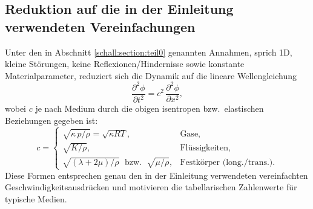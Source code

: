\begin{comment}
\paragraph{Interpretation}
\begin{itemize}
  \item $c_L$ hängt von \emph{Volumensteifigkeit} ab: $(\lambda+2\mu)$ skaliert den Widerstand gegen Volumenänderung (\emph{Druck-/Kompressionswelle}).
  \item $c_T$ hängt allein von der \emph{Schersteifigkeit} $\mu$ ab (\emph{Scherwelle}); in Fluiden ist $\mu\approx 0$, daher keine Transversalwellen.
\end{itemize}

Somit erhält man in isotropen Medien zwei Wellengeschwindigkeiten \cite{schall:landaulifschitz,schall:gurtin}:
\begin{align}
    \boxed{\,c_T=\sqrt{\frac{\mu}{\rho}}=\sqrt{\frac{G}{\rho}}\,} \quad &\text{(transversal, Scherwellen)},\\[2mm]
    \boxed{\,c_L=\sqrt{\frac{\lambda+2\mu}{\rho}}\,} \quad &\text{(longitudinal, Druckwellen)}.
\end{align}
In technischen Materialparametern, sprich Elastizitätsmodul $E$ und Poissonzahl $\nu$, mit
\[
    \mu=G=\frac{E}{2(1+\nu)},
    \qquad
    \lambda=\frac{E\,\nu}{(1+\nu)(1-2\nu)},
\]
ergeben sich die in der Einleitung verwendeten Ausdrücke
\begin{align}
    \boxed{\,c_{s,\mathrm{long}}
    = \sqrt{\frac{E(1-\nu)}{\rho(1+\nu)(1-2\nu)}}\,},\qquad
    \boxed{\,c_{s,\mathrm{trans}}
    = \sqrt{\frac{E}{2\rho(1+\nu)}}=\sqrt{\frac{G}{\rho}}\,}.
\end{align}
Typisch ist $c_L>c_T$, und beide liegen deutlich über Gas- und Flüssigkeitswerten (z.\,B. Stahl $c\approx 5{,}0\text{--}5{,}9\,\mathrm{km/s}$ für Longitudinalwellen, je nach Legierung).

\end{comment}

\subsection{Reduktion auf die in der Einleitung verwendeten Vereinfachungen}
Unter den in Abschnitt \ref{schall:section:teil0} genannten Annahmen, sprich 1D,
kleine Störungen, keine Reflexionen/Hindernisse sowie konstante
Materialparameter, reduziert sich die Dynamik auf die lineare
Wellengleichung
\[
    \frac{\partial^2 \phi}{\partial t^2}=c^2\,\frac{\partial^2 \phi}{\partial x^2},
\]
wobei $c$ je nach Medium durch die obigen isentropen bzw.\ elastischen
Beziehungen gegeben ist:
\[
    c=\begin{cases}
    \sqrt{\kappa\,p/\rho}=\sqrt{\kappa R T}, & \text{Gase},\\[1mm]
    \sqrt{K/\rho}, & \text{Flüssigkeiten},\\[1mm]
    \sqrt{(\lambda+2\mu)/\rho}\;\text{ bzw. }\;\sqrt{\mu/\rho}, & \text{Festkörper (long./trans.)}.
\end{cases}
\]
Diese Formen entsprechen genau den in der Einleitung verwendeten
vereinfachten Geschwindigkeitsausdrücken und motivieren die
tabellarischen Zahlenwerte für typische Medien.
